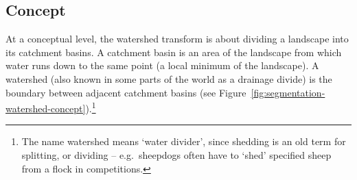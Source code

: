 
\subsection{Concept}


At a conceptual level, the watershed transform is about dividing a landscape into its catchment basins. A catchment basin is an area of the landscape from which water runs down to the same point (a local minimum of the landscape). A watershed (also known in some parts of the world as a drainage divide) is the boundary between adjacent catchment basins (see Figure~\ref{fig:segmentation-watershed-concept}).\footnote{The name watershed means `water divider', since shedding is an old term for splitting, or dividing -- e.g.~sheepdogs often have to `shed' specified sheep from a flock in competitions.}



